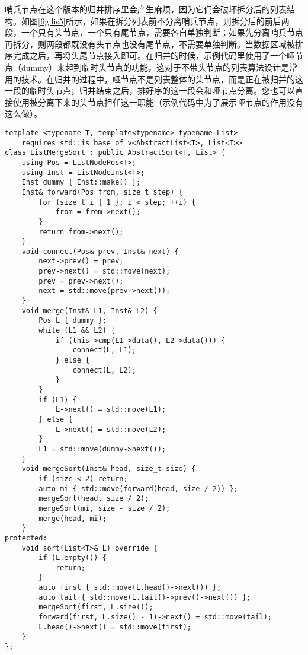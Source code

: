 哨兵节点在这个版本的归并排序里会产生麻烦，因为它们会破坏拆分后的列表结构。如图\ref{fig:lis5}所示，如果在拆分列表前不分离哨兵节点，则拆分后的前后两段，一个只有头节点，一个只有尾节点，需要各自单独判断；如果先分离哨兵节点再拆分，则两段都既没有头节点也没有尾节点，不需要单独判断。当数据区域被排序完成之后，再将头尾节点接入即可。在归并的时候，示例代码里使用了一个哑节点（dummy）来起到临时头节点的功能，这对于不带头节点的列表算法设计是常用的技术。在归并的过程中，哑节点不是列表整体的头节点，而是正在被归并的这一段的临时头节点，归并结束之后，排好序的这一段会和哑节点分离。您也可以直接使用被分离下来的头节点担任这一职能（示例代码中为了展示哑节点的作用没有这么做）。


\begin{lstlisting}
template <typename T, template<typename> typename List>
    requires std::is_base_of_v<AbstractList<T>, List<T>>
class ListMergeSort : public AbstractSort<T, List> {
    using Pos = ListNodePos<T>;
    using Inst = ListNodeInst<T>;
    Inst dummy { Inst::make() };
    Inst& forward(Pos from, size_t step) {
        for (size_t i { 1 }; i < step; ++i) {
            from = from->next();
        }
        return from->next();
    }
    void connect(Pos& prev, Inst& next) {
        next->prev() = prev;
        prev->next() = std::move(next);
        prev = prev->next();
        next = std::move(prev->next());
    }
    void merge(Inst& L1, Inst& L2) {
        Pos L { dummy };
        while (L1 && L2) {
            if (this->cmp(L1->data(), L2->data())) {
                connect(L, L1);
            } else {
                connect(L, L2);
            }
        }
        if (L1) {
            L->next() = std::move(L1);
        } else {
            L->next() = std::move(L2);
        }
        L1 = std::move(dummy->next());
    }
    void mergeSort(Inst& head, size_t size) {
        if (size < 2) return;
        auto mi { std::move(forward(head, size / 2)) };
        mergeSort(head, size / 2);
        mergeSort(mi, size - size / 2);
        merge(head, mi);
    }
protected:
    void sort(List<T>& L) override {
        if (L.empty()) {
            return;
        }
        auto first { std::move(L.head()->next()) };
        auto tail { std::move(L.tail()->prev()->next()) };
        mergeSort(first, L.size());
        forward(first, L.size() - 1)->next() = std::move(tail);
        L.head()->next() = std::move(first);
    }
};
\end{lstlisting}


